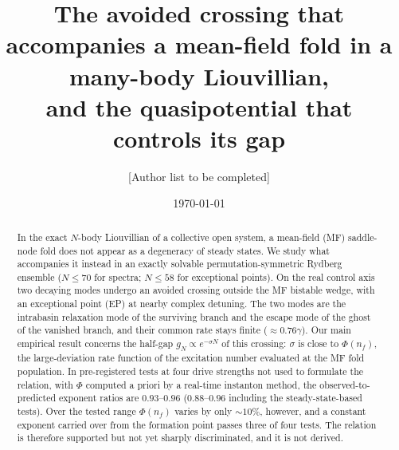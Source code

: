 \documentclass[aps,prl,twocolumn,superscriptaddress,amsmath,amssymb,reprint]{revtex4-2}
\begin{document}
\title{The avoided crossing that accompanies a mean-field fold in a many-body Liouvillian,\\
and the quasipotential that controls its gap}

\author{[Author list to be completed]}
\date{\today}

\begin{abstract}
In the exact $N$-body Liouvillian of a collective open system, a mean-field (MF) saddle-node fold does not appear as a degeneracy of steady states. We study what accompanies it instead in an exactly solvable permutation-symmetric Rydberg ensemble ($N\le70$ for spectra; $N\le58$ for exceptional points). On the real control axis two decaying modes undergo an avoided crossing outside the MF bistable wedge, with an exceptional point (EP) at nearby complex detuning. The two modes are the intrabasin relaxation mode of the surviving branch and the escape mode of the ghost of the vanished branch, and their common rate stays finite ($\approx0.76\gamma$). Our main empirical result concerns the half-gap $g_N\propto e^{-\sigma N}$ of this crossing: $\sigma$ is close to $\Phi(n_f)$, the large-deviation rate function of the excitation number evaluated at the MF fold population. In pre-registered tests at four drive strengths not used to formulate the relation, with $\Phi$ computed a priori by a real-time instanton method, the observed-to-predicted exponent ratios are $0.93$--$0.96$ ($0.88$--$0.96$ including the steady-state-based tests). Over the tested range $\Phi(n_f)$ varies by only $\sim10\%$, however, and a constant exponent carried over from the formation point passes three of four tests. The relation is therefore supported but not yet sharply discriminated, and it is not derived.
\end{abstract}

\maketitle
\end{document}
